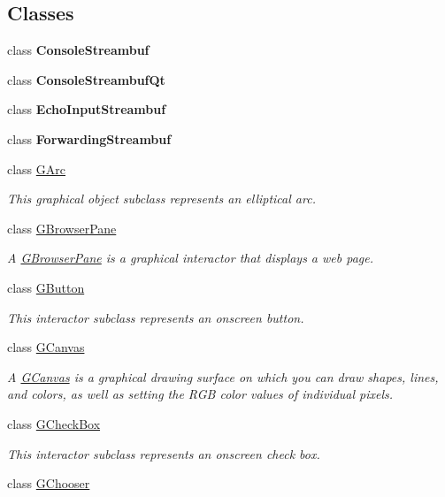 \subsection*{Classes}
\begin{DoxyCompactItemize}
\item 
class {\bfseries Console\+Streambuf}
\item 
class {\bfseries Console\+Streambuf\+Qt}
\item 
class {\bfseries Echo\+Input\+Streambuf}
\item 
class {\bfseries Forwarding\+Streambuf}
\item 
class \mbox{\hyperlink{classsgl_1_1GArc}{G\+Arc}}
\begin{DoxyCompactList}\small\item\em This graphical object subclass represents an elliptical arc. \end{DoxyCompactList}\item 
class \mbox{\hyperlink{classsgl_1_1GBrowserPane}{G\+Browser\+Pane}}
\begin{DoxyCompactList}\small\item\em A \mbox{\hyperlink{classsgl_1_1GBrowserPane}{G\+Browser\+Pane}} is a graphical interactor that displays a web page. \end{DoxyCompactList}\item 
class \mbox{\hyperlink{classsgl_1_1GButton}{G\+Button}}
\begin{DoxyCompactList}\small\item\em This interactor subclass represents an onscreen button. \end{DoxyCompactList}\item 
class \mbox{\hyperlink{classsgl_1_1GCanvas}{G\+Canvas}}
\begin{DoxyCompactList}\small\item\em A \mbox{\hyperlink{classsgl_1_1GCanvas}{G\+Canvas}} is a graphical drawing surface on which you can draw shapes, lines, and colors, as well as setting the R\+GB color values of individual pixels. \end{DoxyCompactList}\item 
class \mbox{\hyperlink{classsgl_1_1GCheckBox}{G\+Check\+Box}}
\begin{DoxyCompactList}\small\item\em This interactor subclass represents an onscreen check box. \end{DoxyCompactList}\item 
class \mbox{\hyperlink{classsgl_1_1GChooser}{G\+Chooser}}

\end{DoxyCompactItemize}
